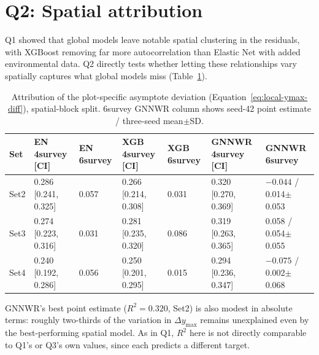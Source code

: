\documentclass[logo,msc,ai]{infthesis}           %
\begin{document}
\section{Q2: Spatial attribution}
Q1 showed that global models leave notable spatial clustering in the residuals, with XGBoost removing far more autocorrelation than Elastic Net with added environmental data. Q2 directly tests whether letting these relationships vary spatially captures what global models miss (Table~\ref{tab:results-q2}).
\begin{table}[!htbp]
\centering
\scriptsize
\renewcommand{\arraystretch}{1.2}
\begin{tabular}{lllllll}
\toprule
Set & EN 4survey [CI] & EN 6survey & XGB 4survey [CI] & XGB 6survey & GNNWR 4survey [CI] & GNNWR 6survey \\
\midrule
Set2 & 0.286 [0.241, 0.325] & 0.057 & 0.266 [0.214, 0.308] & 0.031 & 0.320 [0.270, 0.369] & $-0.044$ / 0.014$\pm$0.053 \\
Set3 & 0.274 [0.223, 0.316] & 0.031 & 0.281 [0.235, 0.320] & 0.086 & 0.319 [0.263, 0.365] & 0.058 / 0.054$\pm$0.055 \\
Set4 & 0.240 [0.192, 0.286] & 0.056 & 0.250 [0.201, 0.295] & 0.015 & 0.294 [0.236, 0.347] & $-0.075$ / 0.002$\pm$0.068 \\
\bottomrule
\end{tabular}
\caption{\small{Attribution of the plot-specific asymptote deviation
(Equation~\ref{eq:local-ymax-diff}), spatial-block split. 6survey GNNWR column shows
seed-42 point estimate / three-seed mean$\pm$SD.}}
\label{tab:results-q2}
\end{table}

GNNWR's best point estimate ($R^2=0.320$, Set2) is also modest in absolute terms: roughly two-thirds of the variation in $\Delta y_{\max}$ remains unexplained even by the best-performing spatial model. As in Q1, $R^2$ here is not directly comparable to Q1's or Q3's own values, since each predicts a different target.
\end{document}
